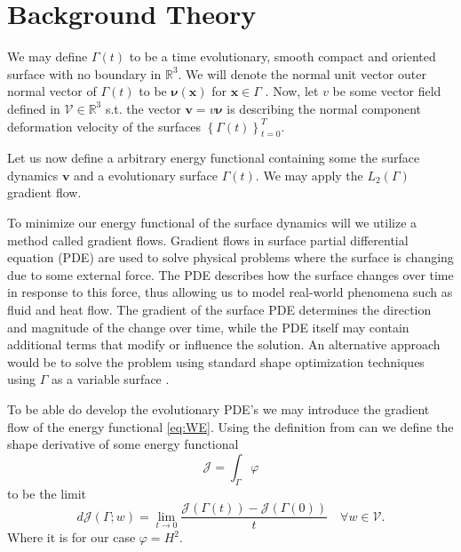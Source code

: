 

\section{Background Theory}%
\label{sec:differential_geometry}

We may define $\Gamma \left( t \right) $ to be a time evolutionary, smooth compact and oriented surface with no boundary in $\mathbb{R} ^{3}$. We will denote the normal unit vector outer normal vector of $\Gamma \left( t \right) $  to be  $
\boldsymbol{\nu} \left( \mathbf{x} \right) $ for $\mathbf{x} \in \Gamma  $ .  Now, let $v$ be some vector field defined in
$\mathcal{V} \in  \mathbb{R}^{3}  $ s.t. the vector $\mathbf{v} = v \boldsymbol{\nu } $  is describing the normal component deformation velocity of the surfaces $\left\{ \Gamma \left( t \right)  \right\}_{t=0}^{T} $.

Let us now define a arbitrary energy functional containing some the surface dynamics $\mathbf{v}$ and a evolutionary surface $\Gamma \left( t \right) $. We may apply the $L_{2}\left( \Gamma  \right) $  gradient flow.

To minimize our energy functional of the surface dynamics will we utilize a method called gradient flows. Gradient flows in surface partial differential equation (PDE) are used to solve physical problems where the surface is changing due to some
external force. The PDE describes how the surface changes over time in response to this force, thus allowing us to model real-world phenomena such as fluid and heat flow. The gradient of the surface PDE determines the direction and magnitude of the
change over time, while the PDE itself may contain additional terms that modify or influence the solution. \cite{dogan2007discrete} An alternative approach would be to solve the problem using standard shape optimization techniques using $\Gamma$ as a variable surface \cite{dalphin2014study}.

To be able do develop the evolutionary PDE's we may introduce the gradient flow of the energy functional \eqref{eq:WE}.  Using the definition from \cite{bouchitte2014shape, bonito2010parametric} can we define the shape derivative of some energy
functional $$\mathcal{J} = \int_{\Gamma }^{} \varphi    $$  to be the limit
\begin{equation*}
d\mathcal{J} \left( \Gamma; w  \right)  = \lim_{t \to 0} \frac{\mathcal{J}\left( \Gamma \left( t \right)  \right) - \mathcal{J} (  \Gamma \left( 0 \right))}{t} \quad \forall w \in  \mathcal{V}
.\end{equation*}
Where it is for our case $\varphi = H ^2$.







